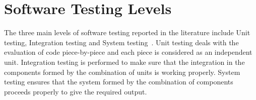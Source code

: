 %
%
%
%



\section{Software Testing Levels}
The three main levels of software testing reported in the literature include Unit testing, Integration testing and System testing~\cite{chilenski1994applicability}. Unit testing deals with the evaluation of code piece-by-piece and each piece is considered as an independent unit. Integration testing is performed to make sure that the integration in the components formed by the combination of units is working properly. System testing ensures that the system formed by the combination of components proceeds properly to give the required output.

